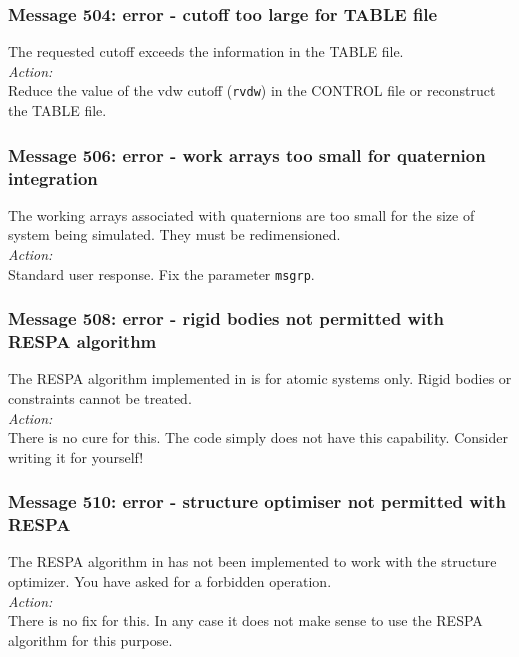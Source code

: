 \subsubsection*{Message 504: error - cutoff too large for TABLE file}
The requested cutoff exceeds the information in the TABLE file.
\\

\noindent
{\em Action:}\\ 
Reduce the value of the vdw cutoff ({\tt rvdw}) in the CONTROL file 
or reconstruct the TABLE file.

\subsubsection*{Message 506: error - work arrays too small for quaternion integration}

The working arrays associated with quaternions are too small for the
size of system being simulated. They must be redimensioned.\\

\noindent
{\em Action:}\\
Standard user response. Fix the parameter {\tt msgrp}.

\subsubsection*{Message 508: error - rigid bodies not permitted with RESPA algorithm}

The RESPA algorithm implemented in \D{} is for atomic systems only.
Rigid bodies  or constraints cannot be treated.\\

\noindent
{\em Action:}\\
There is no cure for this. The code simply does not have this
capability. Consider writing it for yourself!

\subsubsection*{Message 510: error - structure optimiser not permitted
with RESPA}

The RESPA algorithm in \D{} has not been implemented to work with the
structure optimizer. You have asked for a forbidden operation.\\

\noindent
{\em Action:}\\
There is no fix for this. In any case it does not make sense to use
the RESPA algorithm for this purpose.

